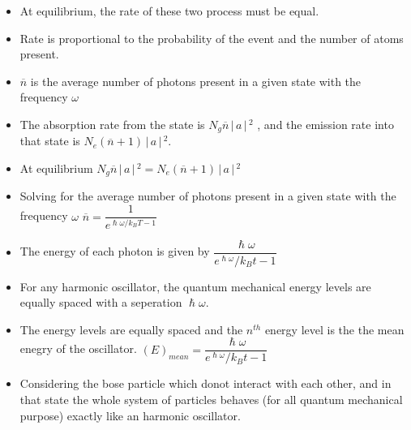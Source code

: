 \documentclass[aspectratio=169]{beamer}
\begin{document}
\begin{frame}
	\begin{itemize}
		\item At equilibrium, the rate of these two process must be equal. \newline
		\item Rate is proportional to the probability of the event and the number of atoms present.\newline
		\item $\overline{n}$ is the average number of photons present in a given state with the frequency $\omega$
	\end{itemize}
\end{frame}

\begin{frame}
	\begin{itemize}
		\item The absorption rate from the state is $N_{g}\overline{n}\,\Bigr\rvert\,a\,\Bigr\rvert\,^{2}$ , and the emission rate into that state is $N_{e}(\overline{n}+1)\,\Bigr\rvert\,a\,\Bigr\rvert\,^{2}$.
		\item At equilibrium  $N_{g}\overline{n}\,\Bigr\rvert\,a\,\Bigr\rvert\,^{2} = N_{e}(\overline{n}+1)\,\Bigr\rvert\,a\,\Bigr\rvert\,^{2}$
	\end{itemize}
\end{frame}

\begin{frame}
	\begin{itemize}
		\item Solving for the average number of photons present in a given state with the frequency $\omega$ \newline
		$\overline{n} = \dfrac{1}{e^{\hslash\omega/k_{B}T - 1}}$ \newline
		\item The energy of each photon is given by $\dfrac{\hslash\omega}{e^{\hslash\omega}/{k_{B}t} - 1}$ \newline
		\item For any harmonic oscillator, the quantum mechanical energy levels are equally spaced with a seperation $\hslash\omega$.
	\end{itemize}
\end{frame}

\begin{frame}
	\begin{itemize}
		\item The energy levels are equally spaced and the $n^{th}$ energy level is the the mean enegry of the oscillator. \newline 
		\center $(E)_{mean} = \dfrac{\hslash\omega}{e^{\hslash\omega}/{k_{B}t} - 1}$ \newline
		\item Considering the bose particle which donot interact with each other, and in that state the whole system of particles behaves (for all quantum mechanical purpose) exactly like an harmonic oscillator. 
	\end{itemize}
\end{frame}
\end{document}
